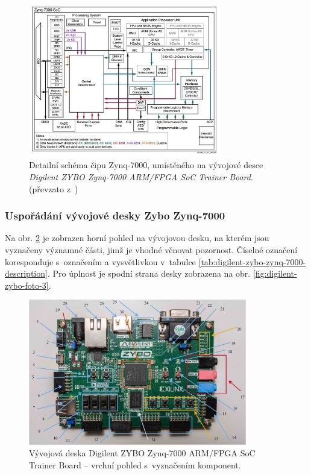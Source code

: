 \documentclass[a4paper, twoside, 11pt]{article}
\newcommand{\fbar}{\FloatBarrier}
\begin{document}
			\begin{figure}[htbp!]
				\centering
					\includegraphics[width=0.75\textwidth]{src/png/zynq-block-diagram-detailed.png} 
					\caption{Detailní schéma čipu Zynq-7000, umístěného na vývojové desce \textit{Digilent ZYBO Zynq-7000 ARM/FPGA SoC Trainer Board}. (převzato z~\cite{xilinx-zynq-7000-technical-reference-manual})}
					\label{fig:zynq-block-diagram-detailed}
			\end{figure}
			\fbar
			\subsubsection{Uspořádání vývojové desky Zybo Zynq-7000}
				Na obr. \ref{fig:digilent-zybo-foto-1-oznacene} je zobrazen horní pohled na vývojovou desku, na kterém jsou vyznačeny významné části, jimž je vhodné věnovat pozornost. Číselné označení koresponduje s~označením a vysvětlivkou v~tabulce \ref{tab:digilent-zybo-zynq-7000-description}. Pro úplnost je spodní strana desky zobrazena na obr. \ref{fig:digilent-zybo-foto-3}.

				\begin{figure}[H]
					\centering
						\includegraphics[width=0.85\textwidth]{src/jpg/digilent-zybo-foto-1-oznacene.jpeg} 
						\caption{Vývojová deska Digilent ZYBO Zynq-7000 ARM/FPGA SoC Trainer Board – vrchní pohled s~vyznačením komponent.}
						\label{fig:digilent-zybo-foto-1-oznacene}
				\end{figure}
\end{document}
